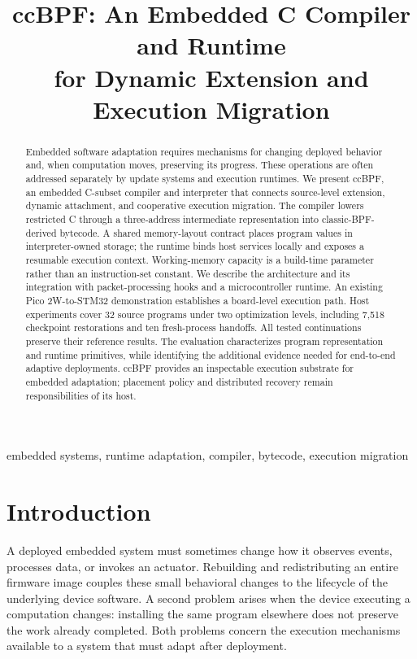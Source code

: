 \documentclass[conference,letterpaper]{IEEEtran}
\title{ccBPF: An Embedded C Compiler and Runtime\\for Dynamic Extension and Execution Migration}
\author{\IEEEauthorblockN{Anonymous submission}}
\author{\IEEEauthorblockN{Skai Uijing}\IEEEauthorblockA{Independent Researcher\\China\\skaiuijing@gmail.com}}
\begin{document}
\maketitle
\begin{abstract}
Embedded software adaptation requires mechanisms for changing deployed behavior and, when computation moves, preserving its progress. These operations are often addressed separately by update systems and execution runtimes. We present ccBPF, an embedded C-subset compiler and interpreter that connects source-level extension, dynamic attachment, and cooperative execution migration. The compiler lowers restricted C through a three-address intermediate representation into classic-BPF-derived bytecode. A shared memory-layout contract places program values in interpreter-owned storage; the runtime binds host services locally and exposes a resumable execution context. Working-memory capacity is a build-time parameter rather than an instruction-set constant. We describe the architecture and its integration with packet-processing hooks and a microcontroller runtime. An existing Pico 2W-to-STM32 demonstration establishes a board-level execution path. Host experiments cover 32 source programs under two optimization levels, including 7,518 checkpoint restorations and ten fresh-process handoffs. All tested continuations preserve their reference results. The evaluation characterizes program representation and runtime primitives, while identifying the additional evidence needed for end-to-end adaptive deployments. ccBPF provides an inspectable execution substrate for embedded adaptation; placement policy and distributed recovery remain responsibilities of its host.
\end{abstract}
\begin{IEEEkeywords}
embedded systems, runtime adaptation, compiler, bytecode, execution migration
\end{IEEEkeywords}

\section{Introduction}
A deployed embedded system must sometimes change how it observes events, processes data, or invokes an actuator. Rebuilding and redistributing an entire firmware image couples these small behavioral changes to the lifecycle of the underlying device software. A second problem arises when the device executing a computation changes: installing the same program elsewhere does not preserve the work already completed. Both problems concern the execution mechanisms available to a system that must adapt after deployment.
\end{document}
